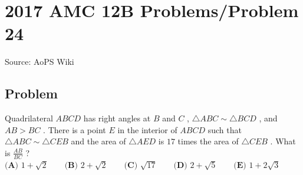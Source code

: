 \documentclass[12pt]{article}
\begin{document}
\section*{{2017 AMC 12B Problems/Problem 24}}
Source: AoPS Wiki

\subsection*{Problem}
Quadrilateral $ABCD$ has right angles at $B$ and $C$ , $\triangle ABC \sim \triangle BCD$ , and $AB > BC$ . There is a point $E$ in the interior of $ABCD$ such that $\triangle ABC \sim \triangle CEB$ and the area of $\triangle AED$ is $17$ times the area of $\triangle CEB$ . What is $\tfrac{AB}{BC}$ ? $\textbf{(A) } 1+\sqrt{2} \qquad \textbf{(B) } 2 + \sqrt{2} \qquad \textbf{(C) } \sqrt{17} \qquad \textbf{(D) } 2 + \sqrt{5} \qquad \textbf{(E) } 1 + 2\sqrt{3}$
\end{document}
